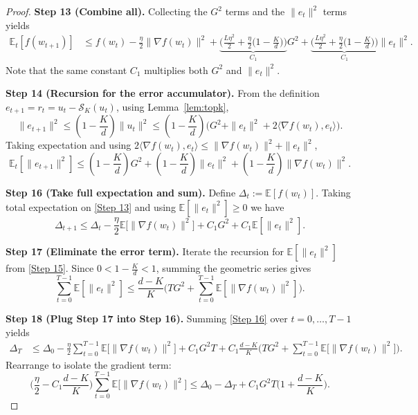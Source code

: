 \documentclass[11pt]{article}
\begin{document}
\begin{proof}
\textbf{Step 13 (Combine all).}  
Collecting the $G^{2}$ terms and the $\|e_{t}\|^{2}$ terms yields
\begin{align}
\mathbb{E}_{t}[f(w_{t+1})]
&\le f(w_{t})-\frac{\eta}{2}\|\nabla f(w_{t})\|^{2}
+ \underbrace{\Big(\frac{L\eta^{2}}{2}+\frac{\eta}{2}\big(1-\tfrac{K}{d}\big)\Big)}_{\displaystyle C_{1}}\! G^{2}
+ \underbrace{\Big(\frac{L\eta^{2}}{2}+\frac{\eta}{2}\big(1-\tfrac{K}{d}\big)\Big)}_{\displaystyle C_{1}}\! \|e_{t}\|^{2} .
\tag{Step 13}
\end{align}
Note that the same constant $C_{1}$ multiplies both $G^{2}$ and $\|e_{t}\|^{2}$.

\textbf{Step 14 (Recursion for the error accumulator).}  
From the definition $e_{t+1}=r_{t}=u_{t}-\mathcal{S}_{K}(u_{t})$, using Lemma~\ref{lem:topk},
\[
\|e_{t+1}\|^{2}\le\left(1-\frac{K}{d}\right)\|u_{t}\|^{2}
\le\left(1-\frac{K}{d}\right)\big(G^{2}+\|e_{t}\|^{2}+2\langle\nabla f(w_{t}),e_{t}\rangle\big).
\tag{Step 14}
\]
Taking expectation and using $2\langle\nabla f(w_{t}),e_{t}\rangle\le \|\nabla f(w_{t})\|^{2}+\|e_{t}\|^{2}$,
\[
\mathbb{E}_{t}[\|e_{t+1}\|^{2}]
\le\left(1-\frac{K}{d}\right)G^{2}
+\left(1-\frac{K}{d}\right)\|e_{t}\|^{2}
+\left(1-\frac{K}{d}\right)\|\nabla f(w_{t})\|^{2}.
\tag{Step 15}
\]

\textbf{Step 16 (Take full expectation and sum).}  
Define $\Delta_{t}:=\mathbb{E}[f(w_{t})]$. Taking total expectation on \eqref{Step 13} and using $\mathbb{E}[\|e_{t}\|^{2}]\ge0$ we have
\[
\Delta_{t+1}\le \Delta_{t}
-\frac{\eta}{2}\mathbb{E}\big[\|\nabla f(w_{t})\|^{2}\big]
+ C_{1}G^{2}+C_{1}\mathbb{E}[\|e_{t}\|^{2}].
\tag{Step 16}
\]

\textbf{Step 17 (Eliminate the error term).}  
Iterate the recursion for $\mathbb{E}[\|e_{t}\|^{2}]$ from \eqref{Step 15}. Since $0<1-\frac{K}{d}<1$, summing the geometric series gives
\[
\sum_{t=0}^{T-1}\mathbb{E}[\|e_{t}\|^{2}]
\le \frac{d-K}{K}\big(TG^{2}+ \sum_{t=0}^{T-1}\mathbb{E}[\|\nabla f(w_{t})\|^{2}]\big).
\tag{Step 17}
\]

\textbf{Step 18 (Plug Step 17 into Step 16).}  
Summing \eqref{Step 16} over $t=0,\dots,T-1$ yields
\begin{align}
\Delta_{T}
&\le \Delta_{0}
-\frac{\eta}{2}\sum_{t=0}^{T-1}\mathbb{E}\big[\|\nabla f(w_{t})\|^{2}\big]
+ C_{1}G^{2}T
+ C_{1}\frac{d-K}{K}\Big(TG^{2}+\sum_{t=0}^{T-1}\mathbb{E}\big[\|\nabla f(w_{t})\|^{2}\big]\Big).
\tag{Step 18}
\end{align}
Rearrange to isolate the gradient term:
\[
\Big(\frac{\eta}{2}-C_{1}\frac{d-K}{K}\Big)\sum_{t=0}^{T-1}\mathbb{E}\big[\|\nabla f(w_{t})\|^{2}\big]
\le \Delta_{0}-\Delta_{T}+ C_{1}G^{2}T\Big(1+\frac{d-K}{K}\Big).
\tag{Step 19}
\]


\end{proof}
\end{document}
